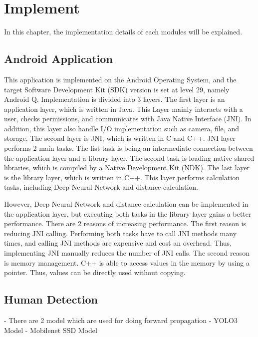 \chapter{Implement}\label{implement}

    In this chapter, the implementation details of each modules will be explained.

    \section{Android Application}
        This application is implemented on the Android Operating System, and the target Software Development Kit (SDK) version is set at level 29, namely Android Q.
        Implementation is divided into 3 layers.
            The first layer is an application layer, which is written in Java.
                This Layer mainly interacts with a user, checks permissions, and communicates with Java Native Interface (JNI).
                In addition, this layer also handle I/O implementation such as camera, file, and storage.
            The second layer is JNI, which is written in C and C++.
                JNI layer performs 2 main tasks.
                    The fist task is being an intermediate connection between the application layer and a library layer.
                    The second task is loading native shared libraries, which is compiled by a Native Development Kit (NDK).
            The last layer is the library layer, which is written in C++.
                This layer performs calculation tasks, including Deep Neural Network and distance calculation.

        However, Deep Neural Network and distance calculation can be implemented in the application layer,
        but executing both tasks in the library layer gains a better performance. There are 2 reasons of increasing performance.
            The first reason is reducing JNI calling. Performing both tasks have to call JNI methods many times, and calling JNI methods are expensive and cost an overhead.
                Thus, implementing JNI manually reduces the number of JNI calls.
            The second reason is memory management. C++ is able to access values in the memory by using a pointer.
                Thus, values can be directly used without copying.

    \section{Human Detection}
        -	There are 2 model which are used for doing forward propagation
            - YOLO3 Model
            - Mobilenet SSD Model


